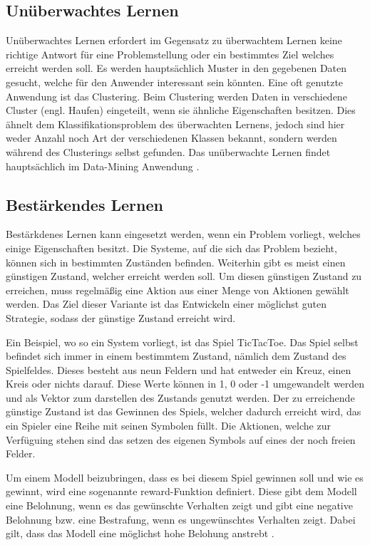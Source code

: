\subsection{Unüberwachtes Lernen}
\label{subsec:unueberwachtesLernen}
Unüberwachtes Lernen erfordert im Gegensatz zu überwachtem Lernen keine richtige Antwort für eine Problemstellung oder ein bestimmtes Ziel welches erreicht werden soll. Es werden hauptsächlich Muster in den gegebenen Daten gesucht, welche für den Anwender interessant sein könnten. Eine oft genutzte Anwendung ist das Clustering. Beim Clustering werden Daten in verschiedene Cluster (engl. Haufen) eingeteilt, wenn sie ähnliche Eigenschaften besitzen. Dies ähnelt dem Klassifikationsproblem des überwachten Lernens, jedoch sind hier weder Anzahl noch Art der verschiedenen Klassen bekannt, sondern werden während des Clusterings selbst gefunden. Das unüberwachte Lernen findet hauptsächlich im Data-Mining Anwendung \cite[vgl.][]{ueberwachtMaschLernen}.

\subsection{Bestärkendes Lernen}
\label{subsec:bestaerkendesLernen}
Bestärkdenes Lernen kann eingesetzt werden, wenn ein Problem vorliegt, welches einige Eigenschaften besitzt. Die Systeme, auf die sich das Problem bezieht, können sich in bestimmten Zuständen befinden. Weiterhin gibt es meist einen günstigen Zustand, welcher erreicht werden soll. Um diesen günstigen Zustand zu erreichen, muss regelmäßig eine Aktion aus einer Menge von Aktionen gewählt werden. Das Ziel dieser Variante ist das Entwickeln einer möglichst guten Strategie, sodass der günstige Zustand erreicht wird.

Ein Beispiel, wo so ein System vorliegt, ist das Spiel TicTacToe. Das Spiel selbst befindet sich immer in einem bestimmtem Zustand, nämlich dem Zustand des Spielfeldes. Dieses besteht aus neun Feldern und hat entweder ein Kreuz, einen Kreis oder nichts darauf. Diese Werte können in 1, 0 oder -1 umgewandelt werden und als Vektor zum darstellen des Zustands genutzt werden. Der zu erreichende günstige Zustand ist das Gewinnen des Spiels, welcher dadurch erreicht wird, das ein Spieler eine Reihe mit seinen Symbolen füllt. Die Aktionen, welche zur Verfüguing stehen sind das setzen des eigenen Symbols auf eines der noch freien Felder.

Um einem Modell beizubringen, dass es bei diesem Spiel gewinnen soll und wie es gewinnt, wird eine sogenannte reward-Funktion definiert. Diese gibt dem Modell eine Belohnung, wenn es das gewünschte Verhalten zeigt und gibt eine negative Belohnung bzw. eine Bestrafung, wenn es ungewünschtes Verhalten zeigt. Dabei gilt, dass das Modell eine möglichst hohe Belohung anstrebt \cite[vgl.][S. 255ff.]{StatMaschLernen}.

